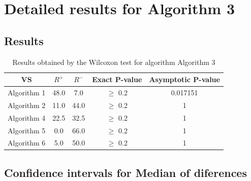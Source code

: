 \documentclass[a4paper,10pt]{article}
\begin{document}
 \clearpage 


\section{Detailed results for Algorithm 3}


\subsection{Results}

\begin{table}[!htp]
\centering\small
\begin{tabular}{
|c|c|c|c|c|}
\hline
 VS & $R^{+}$ & $R^{-}$ & Exact P-value & Asymptotic P-value \\ \hline 
Algorithm 1 & 48.0 & 7.0 & $\geq$ 0.2 & 0.017151\\ \hline 
Algorithm 2 & 11.0 & 44.0 & $\geq$ 0.2 & 1\\ \hline 
Algorithm 4 & 22.5 & 32.5 & $\geq$ 0.2 & 1\\ \hline 
Algorithm 5 & 0.0 & 66.0 & $\geq$ 0.2 & 1\\ \hline 
Algorithm 6 & 5.0 & 50.0 & $\geq$ 0.2 & 1\\ \hline 

\end{tabular}
\caption{Results obtained by the Wilcoxon test for algorithm Algorithm 3}
\end{table}

\subsection{Confidence intervals for Median of diferences}
\end{document}
